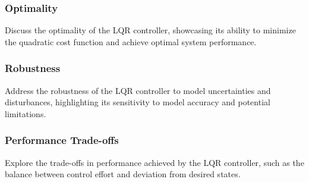\documentclass[10pt,twocolumn,twoside,lineno]{pnas-new}
\begin{document}
\subsubsection*{Optimality}
Discuss the optimality of the LQR controller, showcasing its ability to minimize the quadratic cost function and achieve optimal system performance.

\subsubsection*{Robustness}
Address the robustness of the LQR controller to model uncertainties and disturbances, highlighting its sensitivity to model accuracy and potential limitations.

\subsubsection*{Performance Trade-offs}
Explore the trade-offs in performance achieved by the LQR controller, such as the balance between control effort and deviation from desired states.


\showmatmethods{} %


\showacknow{} %


\end{document}
